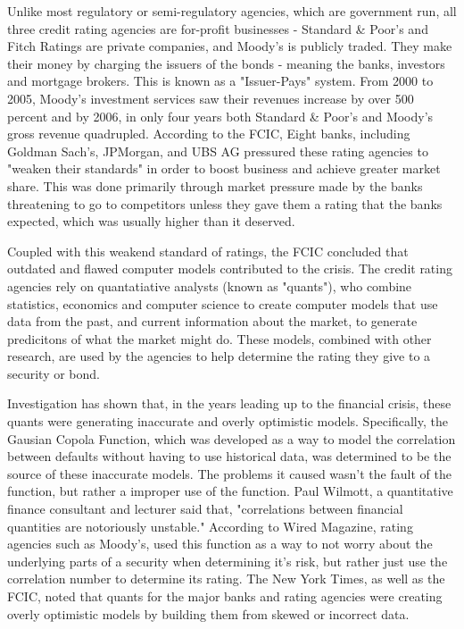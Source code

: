 \documentclass[11pt]{article}
\begin{document}
\begin{multicols}{2}
Unlike most regulatory or semi-regulatory agencies, which are government run, all three credit rating agencies are for-profit businesses - Standard \& Poor's and Fitch Ratings are private companies, and Moody's is publicly traded.  They make their money by charging the issuers of the bonds - meaning the banks, investors and mortgage brokers. This is known as a "Issuer-Pays" system. \cite{gatekeepers} From 2000 to 2005, Moody's investment services saw their revenues increase by over 500 percent\cite{gatekeepers} and by 2006, in only four years both Standard \& Poor's and Moody's gross revenue quadrupled.  According to the FCIC, Eight banks, including Goldman Sach's, JPMorgan, and UBS AG pressured these rating agencies to "weaken their standards" in order to boost business and achieve greater market share. \cite{ratingEthics} This was done primarily through market pressure made by the banks threatening to go to competitors unless they gave them a rating that the banks expected, which was usually higher than it deserved.  

Coupled with this weakend standard of ratings, the FCIC concluded that outdated and flawed computer models contributed to the crisis. \cite[p.~xxv]{govtReport} The credit rating agencies rely on quantatiative analysts (known as "quants"), who combine statistics, economics and computer science to create computer models that use data from the past, and current information about the market, to generate predicitons of what the market might do. \cite{quantsRole} These models, combined with other research, are used by the agencies to help determine the rating they give to a security or bond.

Investigation has shown that, in the years leading up to the financial crisis, these quants were generating inaccurate and overly optimistic models. Specifically, the Gausian Copola Function, which was developed as a way to model the correlation between defaults without having to use historical data, was determined to be the source of these inaccurate models. \cite{wiredFormula} The problems it caused wasn't the fault of the function, but rather a improper use of the function.  Paul Wilmott, a quantitative finance consultant and lecturer said that, "correlations between financial quantities are notoriously unstable." \cite{wiredFormula} According to Wired Magazine, rating agencies such as Moody's, used this function as a way to not worry about the underlying parts of a security when determining it's risk, but rather just use the correlation number to determine its rating.  The New York Times, as well as the FCIC, noted that quants for the major banks and rating agencies were creating overly optimistic models by building them from skewed or incorrect data. \cite{nyTimesQuants, govtReport}


\end{multicols}
\end{document}
